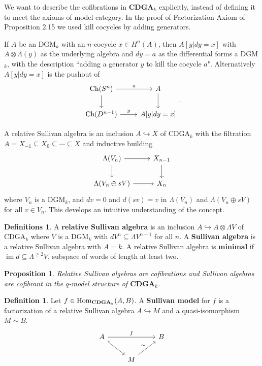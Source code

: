 \documentclass[psamsfonts]{amsart}
\newtheorem{prop}[thm]{Proposition}
\theoremstyle{definition}
\newtheorem{defn}[thm]{Definition}
\newtheorem{defns}[thm]{Definitions}
\theoremstyle{remark}
\newcommand{\Hom}{\textup{Hom}}
\newcommand{\CDGA}{\mathbf{CDGA}}
\newcommand{\ch}{\textup{Ch}}
\DeclareMathOperator{\im}{im}
\numberwithin{equation}{section}
\begin{document}
We want to describe the cofibrations in $\CDGA_k$ explicitly, instead of defining it to meet the axioms of model category. In the proof of Factorization Axiom of Proposition 2.15 we used kill cocycles by adding generators.

If $A$ be an DGM$_k$ with an $n$-cocycle $x\in H^n(A)$, then $A[y|dy=x]$ with $A\otimes\Lambda(y)$ as the underlying algebra and $dy=a$ as the differential forms a DGM$_k$, with the description  ``adding a generator $y$ to kill the cocycle $a$". Alternatively $A[y|dy=x]$ is the pushout of
\[\begin{tikzcd}
\ch(S^n)\arrow[d]\arrow[r,"a"]&A\arrow[d]\\
\ch(D^{n-1})\arrow[r,"y"]&A[y|dy=x]
\end{tikzcd}.\]

A relative Sullivan algebra is an inclusion $A\hookrightarrow X$ of CDGA$_k$ with the filtration $A=X_{-1}\subseteq X_0\subseteq\cdots\subseteq X$ and inductive building
\[\begin{tikzcd}
\Lambda(V_n)\arrow[d]\arrow[r,]&X_{n-1}\arrow[d]\\
\Lambda(V_n\oplus sV)\arrow[r]&X_n
\end{tikzcd}\]
where $V_n$ is a DGM$_k$, and $dv=0$ and $d(sv)=v$ in $\Lambda(V_n)$ and $\Lambda(V_n\oplus sV)$ for all $v\in V_n$. This develops an intuitive understanding of the concept.

\begin{defns}
A \textbf{relative Sullivan algebra} is an inclusion $A\hookrightarrow A\otimes\Lambda V$ of CDGA$_k$ where $V$ is a DGM$_k$ with $dV^n\subseteq\Lambda V^{n-1}$ for all $n$. A \textbf{Sullivan algebra} is a relative Sullivan algebra with $A=k$. A relative Sullivan algebra is \textbf{minimal} if $\im d\subseteq\Lambda^{\geq2}V$, subspace of words of length at least two.
\end{defns}

\begin{prop}
Relative Sullivan algebras are cofibrations and Sullivan algebras are cofibrant in the $q$-model structure of $\CDGA_k$.
\end{prop}

\begin{defn}
Let $f\in\Hom_{\CDGA_k}(A,B)$. A \textbf{Sullivan model} for $f$ is a factorization of a relative Sullivan algebra $A\hookrightarrow M$ and a quasi-isomorphism $M\sim B$.
\[\begin{tikzcd}
A\arrow[dr,hookrightarrow]\arrow[rr,"f"]&&B\\
&M\arrow[ur,"\sim"]
\end{tikzcd}\]
\end{defn}
\end{document}

